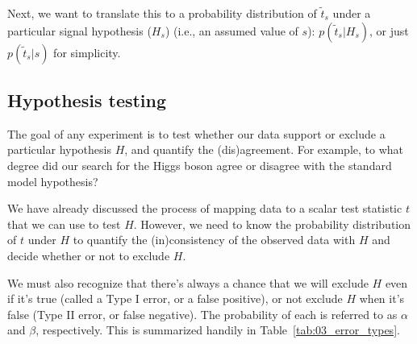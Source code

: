 Next, we want to translate this to a probability distribution of $\tilde{t}_s$ under a particular signal hypothesis ($H_s$) (i.e., an assumed value of $s$): $p(\tilde{t}_s|H_s)$, or just $p(\tilde{t}_s|s)$ for simplicity.


\subsection{Hypothesis testing}
\label{sec:03_hypothesis_testing}

The goal of any experiment is to test whether our data support or exclude a particular hypothesis $H$, and quantify the (dis)agreement. For example, to what degree did our search for the Higgs boson agree or disagree with the standard model hypothesis?

We have already discussed the process of mapping data to a scalar test statistic $t$ that we can use to test $H$.
However, we need to know the probability distribution of $t$ under $H$ to quantify the (in)consistency of the observed data with $H$ and decide whether or not to exclude $H$.

We must also recognize that there's always a chance that we will exclude $H$ even if it's true (called a Type I error, or a false positive), or not exclude $H$ when it's false (Type II error, or false negative).
The probability of each is referred to as $\alpha$ and $\beta$, respectively.
This is summarized handily in Table~\ref{tab:03_error_types}.

